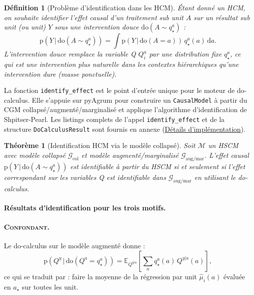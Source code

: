 \documentclass[11pt,a4paper]{article}
\newcommand{\EE}[2]{\mathbb{E}_{#1}\left[ #2 \right]}
\newcommand{\rmdo}{\mathrm{do}}
\newcommand{\g}{\,\vert\,}
\newcommand{\di}{\mathrm{d}}
\newcommand{\pr}{\mathrm{p}}
\newcommand{\col}{\mathrm{col}}
\newcommand{\aug}{\mathrm{aug}}
\newcommand{\mar}{\mathrm{mar}}
\newcommand{\Mc}{\mathcal{M}}
\newtheorem{definition}{Définition}
\newtheorem{theorem}{Théorème}
\begin{document}
\begin{definition}[Problème d'identification dans les HCM]
Étant donné un HCM, on souhaite identifier l'effet causal d'un traitement sub unit $A$ sur un résultat sub unit (ou unit) $Y$ sous une intervention douce $\rmdo(A \sim q^a_\star)$ :
\begin{equation}
  \pr\!\left(Y \g \rmdo(A \sim q^a_\star)\right) = \int \pr(Y \g \rmdo(A = a))\, q^a_\star(a) \, \di a.
  \label{eq:soft_intervention}
\end{equation}
L'intervention douce remplace la variable Q $Q^a_i$ par une distribution fixe $q^a_\star$, ce qui est une intervention plus naturelle dans les contextes hiérarchiques qu'une intervention dure (masse ponctuelle).
\end{definition}

La fonction \texttt{identify\_effect} est le point d'entrée unique pour le moteur de do-calculus.
Elle s'appuie sur pyAgrum pour construire un \texttt{CausalModel} à partir du CGM collapsé/augmenté/marginalisé et applique l'algorithme d'identification de Shpitser-Pearl.
Les listings complets de l'appel \texttt{identify\_effect} et de la structure \texttt{DoCalculusResult} sont fournis en annexe (\hyperref[app:implementation_details]{Détails d'implémentation}).

\begin{theorem}[Identification HCM via le modèle collapsé]
\label{thm:identification}
Soit $\Mc$ un HSCM avec modèle collapsé $\mathcal{G}_\col$ et modèle augmenté/marginalisé $\mathcal{G}_{\aug/\mar}$.
L'effet causal $\pr(Y \g \rmdo(A \sim q^a_\star))$ est identifiable à partir du HSCM si et seulement si l'effet correspondant sur les variables Q est identifiable dans $\mathcal{G}_{\aug/\mar}$ en utilisant le do-calculus.
\end{theorem}

\paragraph{Résultats d'identification pour les trois motifs.}

\paragraph{\textsc{Confondant}.}
Le do-calculus sur le modèle augmenté donne :
\begin{equation}
  \pr(Q^y \g \rmdo(Q^a = q^a_\star)) = \EE{Q^{y|a}}{\sum_a q^a_\star(a)\, Q^{y|a}(a)},
  \label{eq:confounder_id}
\end{equation}
ce qui se traduit par : faire la moyenne de la régression par unit $\hat{\mu}_i(a)$ évaluée en $a_\star$ sur toutes les unit.
\end{document}

